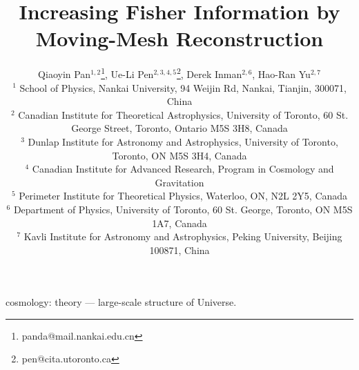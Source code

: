 \documentclass[fleqn,useAMS,usenatbib]{mnras}
\begin{document}
\title[Information increase by Moving-Mesh Reconstruction]
{Increasing Fisher Information by Moving-Mesh Reconstruction}
\author[Pan et al.]
{Qiaoyin Pan$^{1,2}$\thanks{panda@mail.nankai.edu.cn},
Ue-Li Pen$^{2,3,4,5}$\thanks{pen@cita.utoronto.ca},
Derek Inman$^{2,6}$,
Hao-Ran Yu$^{2,7}$\\
$^{1}$ School of Physics, Nankai University, 94 Weijin Rd, Nankai, Tianjin, 300071, China\\
$^{2}$ Canadian Institute for Theoretical Astrophysics, University of Toronto, 60 St. George Street, Toronto, Ontario M5S 3H8, Canada\\
$^{3}$ Dunlap Institute for Astronomy and Astrophysics, University of Toronto, Toronto, ON M5S 3H4, Canada\\
$^{4}$ Canadian Institute for Advanced Research, Program in Cosmology and Gravitation\\
$^{5}$ Perimeter Institute for Theoretical Physics, Waterloo, ON, N2L 2Y5, Canada\\
$^{6}$ Department of Physics, University of Toronto, 60 St. George, Toronto, ON M5S 1A7, Canada\\
$^{7}$ Kavli Institute for Astronomy and Astrophysics, Peking University, Beijing 100871, China}

\pagerange{\pageref{firstpage}--\pageref{lastpage}} 
\maketitle
\label{firstpage}



\begin{keywords}
  cosmology: theory --- large-scale structure of Universe.
\end{keywords}
















\bsp	%
\label{lastpage}
\end{document}

